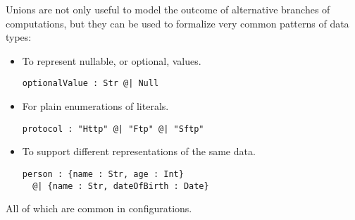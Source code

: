 \documentclass[sigplan,10pt,review,anonymous]{acmart}
\begin{document}

Unions are not only useful to model the outcome of alternative
branches of computations, but they can be used to
formalize very common patterns of data types:
\begin{itemize}
    \item To represent nullable, or optional, values.
\begin{lstlisting}[language=nickel]
optionalValue : Str @| Null
\end{lstlisting}

    \item For plain enumerations of literals.
\begin{lstlisting}[language=nickel]
protocol : "Http" @| "Ftp" @| "Sftp"
\end{lstlisting}

    \item To support different representations of the same data.
\begin{lstlisting}[language=nickel]
person : {name : Str, age : Int}
  @| {name : Str, dateOfBirth : Date}
\end{lstlisting}

\end{itemize}
All of which are common in configurations.



\end{document}
